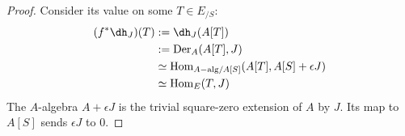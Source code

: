 \documentclass[11pt,reqno]{amsart}
\theoremstyle{definition}
\newcommand{\Hom}{\textrm{Hom}}
\newcommand{\Der}{\textrm{Der}}
\newcommand{\dd}[1]{\dh_{#1}}
\newcommand{\Aalg}{A-{\rm alg}}
\begin{document}
\begin{proof}
Consider its value on some $T \in E_{/S}$: 
\[\begin{split}
    (f^* \dd{J})(T)      &:= \dd{J}(A[T])       \\
            &:= \Der_A(A[T], J)     \\
	    &\simeq \Hom_{\Aalg/A[S]}(A[T], A[S] + \epsilon J) \\
            &\simeq \Hom_{E}(T, J)
\end{split}\]
	The $A$-algebra $A + \epsilon J$ is the trivial square-zero extension of $A$ by $J$.  Its map to $A[S]$ sends $\epsilon J$ to $0$.
\end{proof}
\end{document}
